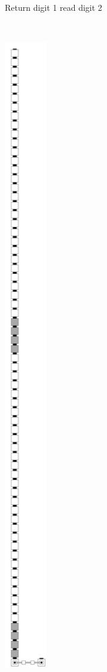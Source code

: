\begin{figure}[H]
\begin{subfigure}[t]{0.2\textwidth}
        \caption{\label{fig:return_digit1_read_digit2_general} Return digit 1 read digit 2}
    \end{subfigure}%
    ~
    \begin{subfigure}[t]{0.2\textwidth}
        \centering
        \includegraphics[width=0.2\textwidth]{return_paths/return_digit1_read_digit2_case2_msr}

\end{subfigure}
\end{figure}
